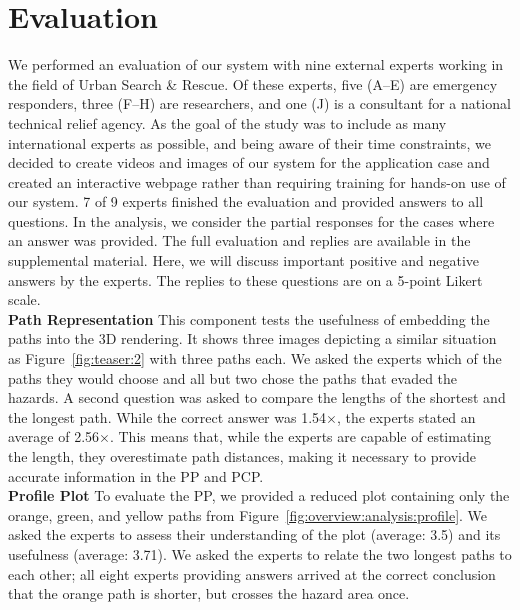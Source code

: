 \documentclass{egpubl}
\begin{document}

\section{Evaluation} \label{sec:evaluation}
We performed an evaluation of our system with nine external experts working in the field of Urban Search \& Rescue. Of these experts, five (A--E) are emergency responders, three (F--H) are researchers, and one (J) is a consultant for a national technical relief agency. As the goal of the study was to include as many international experts as possible, and being aware of their time constraints, we decided to create videos and images of our system for the application case and created an interactive webpage rather than requiring training for hands-on use of our system. 7 of 9 experts finished the evaluation and provided answers to all questions. In the analysis, we consider the partial responses for the cases where an answer was provided. The full evaluation and replies are available in the supplemental material. Here, we will discuss important positive and negative answers by the experts. The replies to these questions are on a 5-point Likert scale. \\
\textbf{Path Representation} This component tests the usefulness of embedding the paths into the 3D rendering. It shows three images depicting a similar situation as Figure~\ref{fig:teaser:2} with three paths each. We asked the experts which of the paths they would choose and all but two chose the paths that evaded the hazards. A second question was asked to compare the lengths of the shortest and the longest path. While the correct answer was 1.54$\times$, the experts stated an average of 2.56$\times$. This means that, while the experts are capable of estimating the length, they overestimate path distances, making it necessary to provide accurate information in the PP and PCP.\\
\textbf{Profile Plot} To evaluate the PP, we provided a reduced plot containing only the orange, green, and yellow paths from Figure~\ref{fig:overview:analysis:profile}. We asked the experts to assess their understanding of the plot (average: 3.5) and its usefulness (average: 3.71). We asked the experts to relate the two longest paths to each other; all eight experts providing answers arrived at the correct conclusion that the orange path is shorter, but crosses the hazard area once. \\
\end{document}
